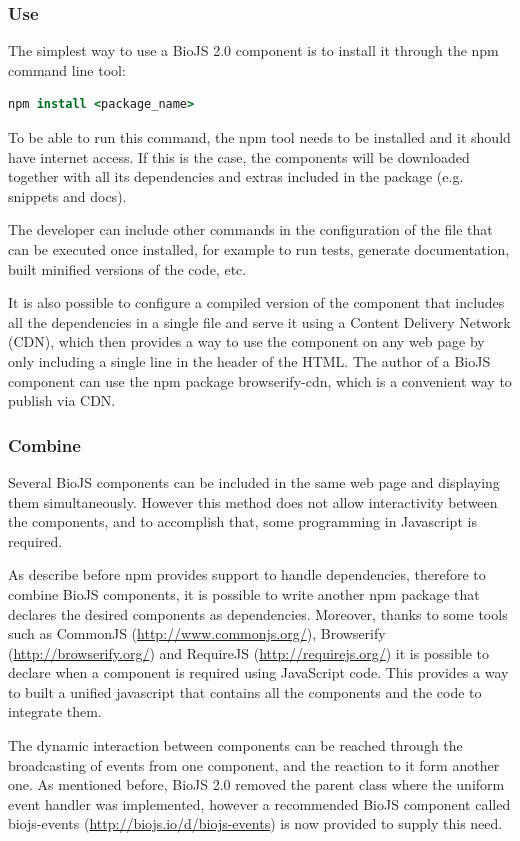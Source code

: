 \subsubsection{Use}
The simplest way to use a BioJS 2.0 component is to install it through the npm command line tool:
\begin{lstlisting}[language=csh]
npm install <package_name>
\end{lstlisting}

To be able to run this command, the npm tool needs to be installed and it should have internet access. If this is the case, the components will be downloaded together with all its dependencies and extras included in the package (e.g. snippets and docs). 

The developer can include other commands in the configuration of the file that can be executed once installed, for example to run tests, generate documentation, built minified versions of the code, etc.

It is also possible to configure a compiled version of the component that includes all the dependencies in a single file and serve it using a Content Delivery Network (CDN), which then provides a way to use the component on any web page by only including a single line in the header of the HTML. The author of a BioJS component can use the npm package browserify-cdn, which is a convenient way to publish via CDN.

\subsubsection{Combine}
Several BioJS components can be included in the same web page and displaying them simultaneously. However this method does not allow interactivity between the components, and to accomplish that, some programming in Javascript is required.
 
As describe before npm provides support to handle dependencies, therefore to combine BioJS components, it is possible to write another npm package that declares the desired components as dependencies. Moreover, thanks to some tools such as CommonJS (\url{http://www.commonjs.org/}), Browserify (\url{http://browserify.org/}) and RequireJS (\url{http://requirejs.org/}) it is possible to declare when a component is required using JavaScript code. This provides a way to built a unified javascript that contains all the components and the code to integrate them.

The dynamic interaction between components can be reached through the broadcasting of events from one component, and the reaction to it form another one. As mentioned before, BioJS 2.0 removed the parent class where the uniform event handler was implemented, however a recommended BioJS component called biojs-events (\url{http://biojs.io/d/biojs-events}) is now provided to supply this need.

